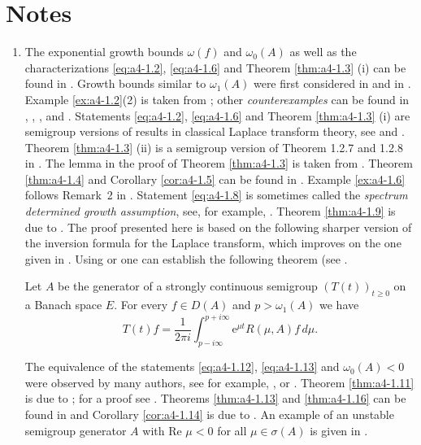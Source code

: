 \section*{Notes}
\begin{enumerate}[label=\emph{Section \arabic*:}, wide, itemsep=1ex]

\item 
The exponential growth bounds $\omega(f)$ and $\omega_{0}(A)$ as well as the characterizations \eqref{eq:a4-1.2}, \eqref{eq:a4-1.6} and Theorem \ref{thm:a4-1.3} (i) can be found in \citet{hillephillips:1957}.
Growth bounds similar to $\omega_{1}(A)$ were first considered in \citet{djacenko:1976} and in \citet[Proposition~2]{zabczyk:1979}. 
Example \ref{ex:a4-1.2}(2) is taken from \citet{wolff:1981}; other \emph{counterexamples} can be found in \citet{hillephillips:1957}, \citet{foias:1973}, \citet{triggiani:1975a}, 
\citet{zabczyk:1975} and \citet{greineretal:1981}. 
Statements \eqref{eq:a4-1.2}, \eqref{eq:a4-1.6} and Theorem \ref{thm:a4-1.3} (i) are semigroup versions of results in classical Laplace transform theory, see \citet{hillephillips:1957} and \citet{widder:1946}. 
Theorem \ref{thm:a4-1.3} (ii) is a semigroup version of Theorem 1.2.7 and 1.2.8 in \citet{doetsch:1950}. 
The lemma in the proof of Theorem \ref{thm:a4-1.3} is taken from \citet{milstein:1975}. 
Theorem \ref{thm:a4-1.4} and Corollary \ref{cor:a4-1.5} can be found in \citet{neubrander:1985a}. 
Example \ref{ex:a4-1.6} follows Remark~2 in \citet{zabczyk:1975}. 
Statement \eqref{eq:a4-1.8} is sometimes called the \emph{spectrum determined growth assumption}, see, for example, \citet{triggiani:1975b}. 
Theorem \ref{thm:a4-1.9} is due to \citet{slemrod:1976}. 
The proof presented here is based on the following sharper version of the inversion formula for the Laplace transform, which improves on the one given in \citet[p.349]{hillephillips:1957}. 
Using \citet[p.66]{widder:1946} or \citet[p.212]{doetsch:1950} one can establish the following theorem (see \citet{neubrander:1984b}.

\begin{theorem}\label{thm:a4-2.6}
Let $A$ be the generator of a strongly continuous semigroup $(T(t))_{t \geq 0}$ on a Banach space $E$. 
For every $f \in D(A)$ and $p > \omega_{1}(A)$ we have
\[
T(t)f = \frac{1}{2\pi i} \int_{p-i\infty}^{p+i\infty} \mathrm{e}^{\mu t}R(\mu,A)f \, d\mu.
\]
\end{theorem}


The equivalence of the statements \eqref{eq:a4-1.12}, \eqref{eq:a4-1.13} and \emph{$\omega_{0}(A) < 0$} were observed by many authors, see for example, \citet[p.178]{balakrishnan:1976}, 
or \citet{benchimol:1978b}. 
Theorem \ref{thm:a4-1.11} is due to \citet{datko:1970};
for a proof see \citet[p.116]{pazy:1983}. 
Theorems \ref{thm:a4-1.13} and \ref{thm:a4-1.16} can be found in \citet{neubrander:1985b} and Corollary \ref{cor:a4-1.14} is due to \citet{komatsu:1969}. 
An example of an unstable semigroup generator $A$ with Re $\mu < 0$ for all $\mu \in \sigma(A)$ is given in \citet{datko:1983}.


\end{enumerate}
